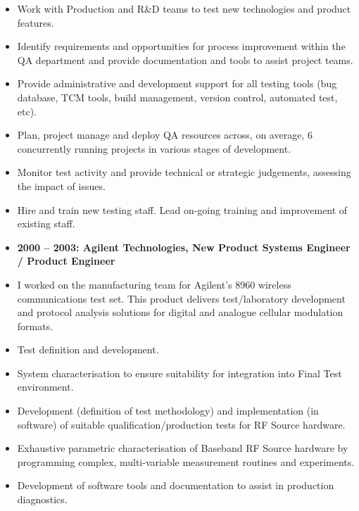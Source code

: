 \documentclass[a4paper,10pt]{article}
\begin{document}
\begin{itemize}[label=\FilledSmallSquare, leftmargin=50pt]
\item Work with Production and R\&D teams to test new technologies and product features.
\item Identify requirements and opportunities for process improvement within the QA department and provide documentation and tools to assist project teams.
\item Provide administrative and development support for all testing tools (bug database, TCM tools, build management, version control, automated test, etc).
\item Plan, project manage and deploy QA resources across, on average, 6 concurrently running projects in various stages of development.
\item Monitor test activity and provide technical or strategic judgements, assessing the impact of issues.
\item Hire and train new testing staff. Lead on-going training and improvement of existing staff.
\\
\end{itemize}

\begin{itemize}[align=left]
\item[] \textbf{2000 – 2003: Agilent Technologies, New Product Systems Engineer / Product Engineer}
\item[] I worked on the manufacturing team for Agilent’s 8960 wireless
  communications test set. This product delivers test/laboratory development
    and protocol analysis solutions for digital and analogue cellular
    modulation formats.
\\
\end{itemize}

\begin{itemize}[label=\FilledSmallSquare, leftmargin=50pt]
\item Test definition and development.
\item System characterisation to ensure suitability for integration into Final Test environment.
\item Development (definition of test methodology) and implementation (in software) of suitable qualification/production tests for RF Source hardware.
\item Exhaustive parametric characterisation of Baseband RF Source hardware by programming complex, multi-variable measurement routines and experiments.
\item Development of software tools and documentation to assist in production diagnostics.
\\
\end{itemize}
\end{document}
